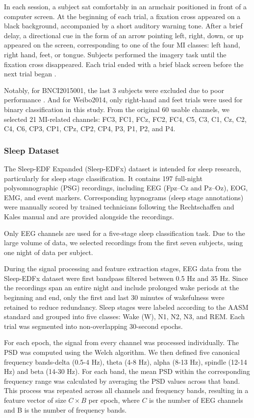 \documentclass[journal,twocolumn]{IEEEtran}
\begin{document}
In each session, a subject sat comfortably in an armchair positioned in front of a computer screen. At the beginning of each trial, a fixation cross appeared on a black background, accompanied by a short auditory warning tone. After a brief delay, a directional cue in the form of an arrow pointing left, right, down, or up appeared on the screen, corresponding to one of the four MI classes: left hand, right hand, feet, or tongue. Subjects performed the imagery task until the fixation cross disappeared. Each trial ended with a brief black screen before the next trial began \cite{tangermann2012review}.

Notably, for BNCI2015001, the last 3 subjects were excluded due to poor performance \cite{faller2012autocalibration}. And for Weibo2014, only right-hand and feet trials were used for binary classification in this study. From the original 60 usable channels, we selected 21 MI-related channels: FC3, FC1, FCz, FC2, FC4, C5, C3, C1, Cz, C2, C4, C6, CP3, CP1, CPz, CP2, CP4, P3, P1, P2, and P4.


\subsubsection{Sleep Dataset}
The Sleep-EDF Expanded (Sleep-EDFx) dataset is intended for sleep research, particularly for sleep stage classification. It contains 197 full-night polysomnographic (PSG) recordings, including EEG (Fpz–Cz and Pz–Oz), EOG, EMG, and event markers. Corresponding hypnograms (sleep stage annotations) were manually scored by trained technicians following the Rechtschaffen and Kales manual and are provided alongside the recordings.

Only EEG channels are used for a five-stage sleep classification task. Due to the large volume of data, we selected recordings from the first seven subjects, using one night of data per subject.

During the signal processing and feature extraction stages, EEG data from the Sleep-EDFx dataset were first bandpass filtered between 0.5 Hz and 35 Hz. Since the recordings span an entire night and include prolonged wake periods at the beginning and end, only the first and last 30 minutes of wakefulness were retained to reduce redundancy. Sleep stages were labeled according to the AASM standard and grouped into five classes: Wake (W), N1, N2, N3, and REM. Each trial was segmented into non-overlapping 30-second epochs.

For each epoch, the signal from every channel was processed individually. The PSD was computed using the Welch algorithm. We then defined five canonical frequency bands-delta (0.5-4 Hz), theta (4-8 Hz), alpha (8-13 Hz), spindle (12-14 Hz) and beta (14-30 Hz). For each band, the mean PSD within the corresponding frequency range was calculated by averaging the PSD values across that band. This process was repeated across all channels and frequency bands, resulting in a feature vector of size $C \times B$ per epoch, where $C$ is the number of EEG channels and B is the number of frequency bands.
\end{document}

